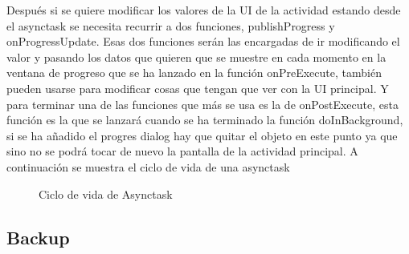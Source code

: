 Después si se quiere modificar los valores de la UI de la actividad estando desde el asynctask se necesita recurrir a dos funciones, publishProgress y onProgressUpdate.
Esas dos funciones serán las encargadas de ir modificando el valor y pasando los datos que quieren que se muestre en cada momento en la ventana de progreso que se ha lanzado en la función onPreExecute, también pueden usarse para modificar cosas que tengan que ver con la UI principal.
Y para terminar una de las funciones que más se usa es la de onPostExecute, esta función es la que se lanzará cuando se ha terminado  la función doInBackground, si se ha añadido el progres dialog hay que quitar el objeto en este punto ya que sino no se podrá tocar de nuevo la pantalla de la actividad principal.
A continuación se muestra el ciclo de vida de una asynctask

\begin{figure}[H] 
  \begin{center} 
    \caption{Ciclo de vida de Asynctask} 
    \label{fig:CicloVidaAsynctask} 
  \end{center} 
\end{figure}

\subsection{Backup}
\label{subsecc:Backup}

